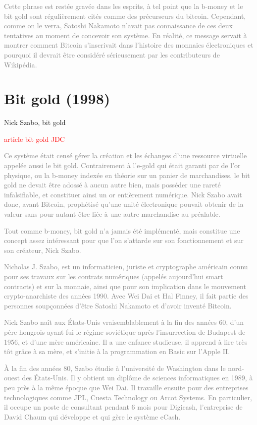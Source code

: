 \textcolor{gray}{Cette phrase est restée gravée dans les esprits, à tel point que la b-money et le bit gold sont régulièrement cités comme des précurseurs du bitcoin. Cependant, comme on le verra, Satoshi Nakamoto n'avait pas connaissance de ces deux tentatives au moment de concevoir son système. En réalité, ce message servait à montrer comment Bitcoin s'inscrivait dans l'histoire des monnaies électroniques et pourquoi il devrait être considéré sérieusement par les contributeurs de Wikipédia.}

\section{Bit gold (1998)}

Nick Szabo, bit gold

\textcolor{red}{article bit gold JDC}

\textcolor{gray}{Ce système était censé gérer la création et les échanges d'une ressource virtuelle appelée aussi le bit gold. Contrairement à l'e-gold qui était garanti par de l'or physique, ou la b-money indexée en théorie sur un panier de marchandises, le bit gold ne devait être adossé à aucun autre bien, mais posséder une rareté infalsifiable, et constituer ainsi un or entièrement numérique. Nick Szabo avait donc, avant Bitcoin, prophétisé qu'une unité électronique pouvait obtenir de la valeur sans pour autant être liée à une autre marchandise au préalable.}

\textcolor{gray}{Tout comme b-money, bit gold n'a jamais été implémenté, mais constitue une concept assez intéressant pour que l'on s'attarde sur son fonctionnement et sur son créateur, Nick Szabo.}

\textcolor{gray}{Nicholas J. Szabo, est un informaticien, juriste et cryptographe américain connu pour ses travaux sur les contrats numériques (appelés aujourd'hui smart contracts) et sur la monnaie, ainsi que pour son implication dans le mouvement crypto-anarchiste des années 1990. Avec Wei Dai et Hal Finney, il fait partie des personnes soupçonnées d'être Satoshi Nakamoto et d'avoir inventé Bitcoin.}

\textcolor{gray}{Nick Szabo naît aux États-Unis vraisemblablement à la fin des années 60, d'un père hongrois ayant fui le régime soviétique après l'insurrection de Budapest de 1956, et d'une mère américaine. Il a une enfance studieuse, il apprend à lire très tôt grâce à sa mère, et s'initie à la programmation en Basic sur l'Apple II.}

\textcolor{gray}{À la fin des années 80, Szabo étudie à l'université de Washington dans le nord-ouest des États-Unis. Il y obtient un diplôme de sciences informatiques en 1989, à peu près à la même époque que Wei Dai. Il travaille ensuite pour des entreprises technologiques comme JPL, Cuesta Technology ou Arcot Systems. En particulier, il occupe un poste de consultant pendant 6 mois pour Digicash, l'entreprise de David Chaum qui développe et qui gère le système eCash.}

